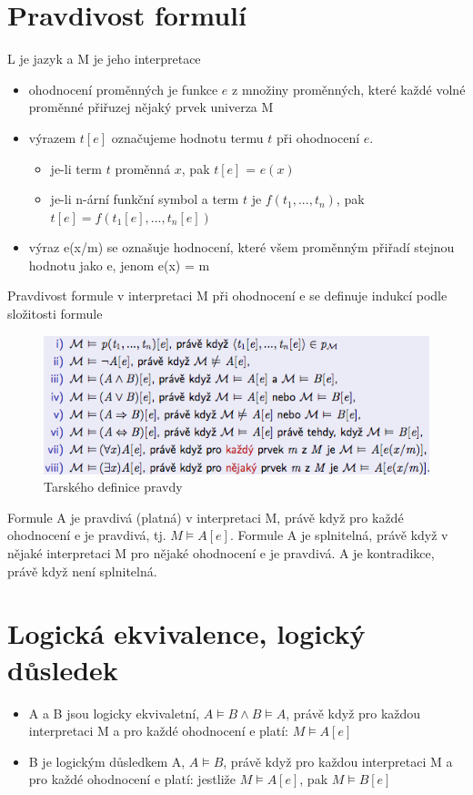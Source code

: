 \documentclass{szzclass}
\begin{document}
\section{Pravdivost formulí}
L je jazyk a M je jeho interpretace
\begin{itemize}
  \item ohodnocení proměnných je funkce $e$ z množiny proměnných, které každé volné proměnné přiřuzej nějaký prvek univerza M
  \item výrazem $t[e]$ označujeme hodnotu termu $t$ při ohodnocení $e$.
  \begin{itemize}
    \item je-li term $t$ proměnná $x$, pak $t[e]$ = $e(x)$
    \item je-li n-ární funkční symbol a term $t$ je $f(t_1,...,t_n)$, pak $t[e] = f(t_1[e],...,t_n[e])$
  \end{itemize}
  \item výraz e(x/m) se oznašuje hodnocení, které všem proměnným přiřadí stejnou hodnotu jako e, jenom e(x) = m
\end{itemize}
Pravdivost formule v interpretaci M při ohodnocení e se definuje indukcí podle složitosti formule
\begin{figure}[!h]
  \centering
  \includegraphics[width=\textwidth]{topics/bi-spol-15/images/logicalEvaluation.png}
  \caption{Tarského definice pravdy}
\end{figure}
Formule A je pravdivá (platná) v interpretaci M, právě když pro každé ohodnocení e je pravdivá, tj. $M \models A[e]$.
\newline
Formule A je splnitelná, právě když v nějaké interpretaci M pro nějaké ohodnocení e je pravdivá.
\newline
A je kontradikce, právě když není splnitelná.
\section{Logická ekvivalence, logický důsledek}
\begin{itemize}
  \item A a B jsou logicky ekvivaletní, $A \models B \wedge B \models A$, právě když pro každou interpretaci M a pro každé ohodnocení e platí: $M \models A[e]$
  \item B je logickým důsledkem A, $A \models B$, právě když pro každou interpretaci M a pro každé ohodnocení e platí: jestliže $M \models A[e]$, pak $M \models B[e]$
\end{itemize}
\end{document}
